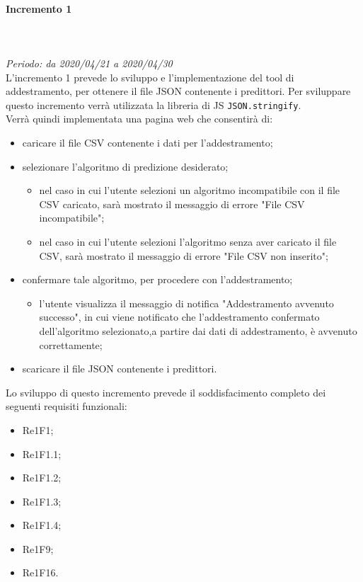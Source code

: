 \paragraph{Incremento 1}\mbox{} \\ \mbox{} \\ 
\textit{Periodo: da 2020/04/21 a 2020/04/30}\\
L’incremento 1 prevede lo sviluppo e l’implementazione del tool di addestramento, per ottenere il file JSON contenente i predittori. Per sviluppare questo incremento verrà utilizzata la libreria di JS \texttt{JSON.stringify}. \\
Verrà quindi implementata una pagina web che consentirà di: \begin{itemize}
\item caricare il file CSV contenente i dati per l'addestramento;
\item selezionare l'algoritmo di predizione desiderato;
\begin{itemize}
\item nel caso in cui l’utente selezioni un algoritmo incompatibile con il file CSV caricato, sarà mostrato il messaggio di errore "File CSV incompatibile";
\item nel caso in cui l'utente selezioni l'algoritmo senza aver caricato il file CSV, sarà mostrato il messaggio di errore "File CSV non inserito";
\end{itemize}
\item confermare tale algoritmo, per procedere con l'addestramento;
\begin{itemize}
\item l’utente visualizza il messaggio di notifica "Addestramento avvenuto successo", in cui viene notificato che l’addestramento confermato dell’algoritmo selezionato,a partire dai dati di addestramento, è avvenuto correttamente;
\end{itemize}
\item scaricare il file JSON contenente i predittori.
\end{itemize}
Lo sviluppo di questo incremento prevede il soddisfacimento completo dei seguenti requisiti funzionali:
\begin{itemize}
\item Re1F1;
\item Re1F1.1;
\item Re1F1.2;
\item Re1F1.3;
\item Re1F1.4;
\item Re1F9;
\item Re1F16.
\end{itemize}
